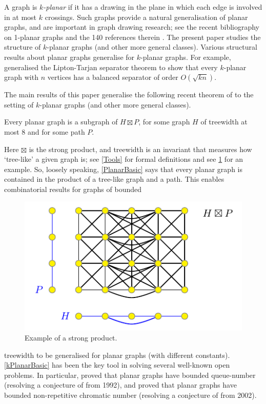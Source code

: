 \documentclass{patmorin}
\begin{document}
A graph is \emph{$k$-planar} if it has a drawing in the plane in which each edge is involved in at most $k$ crossings. Such graphs provide a natural generalisation of planar graphs, and are important in graph drawing research; see the recent bibliography on 1-planar graphs and the 140 references therein \citep{kobourov.liotta.ea:annotated}. The present paper studies the structure of $k$-planar graphs (and other more general classes). Various structural results about planar graphs generalise for $k$-planar graphs. For example, \citet{FP08} generalised the Lipton-Tarjan separator theorem to show that every $k$-planar graph with $n$ vertices has a balanced separator of order $O(\sqrt{kn})$. 

The main results of this paper generalise the following recent theorem of \citet{dujmovic.joret.ea:planar} to the setting of $k$-planar graphs (and other more general classes). 

\begin{thm} 
\label{PlanarBasic}
Every planar graph is a subgraph of $H\boxtimes P$, for some graph $H$ of treewidth at most $8$ and for some path $P$. 
\end{thm}

Here $\boxtimes$ is the strong product, and treewidth is an invariant that measures how `tree-like' a given graph is; see \cref{Tools} for formal definitions and see \cref{ProductExample} for an example.  
So, loosely speaking, \cref{PlanarBasic} says that every planar graph is contained in the product of a tree-like graph and a path. This enables combinatorial results for graphs of bounded 
\begin{figure} 
\centering
\includegraphics{ProductExample}
\caption{Example of a strong product.}
\label{ProductExample}
\end{figure}
treewidth to be generalised for planar graphs (with different constants). \cref{kPlanarBasic} has been the key tool in solving several well-known open problems. In particular, \citet{dujmovic.joret.ea:planar} proved that planar graphs have bounded queue-number (resolving a conjecture of \citet{HLR92} from 1992), and \citet{dujmovic.esperet.ea:planar}  proved that planar graphs have bounded non-repetitive chromatic number (resolving a conjecture of \citet{AGHR-RSA02} from 2002). 
\end{document}
